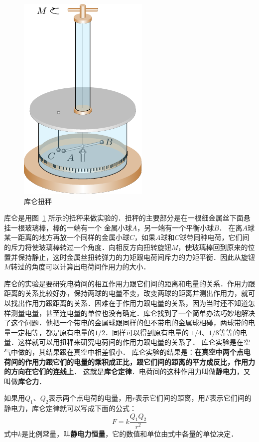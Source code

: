 \begin{figure}[htbp]
    \centering
    \includegraphics{fig/B/6-3.pdf}
    \caption{库仑扭秤}\label{fig_B_6-3}
\end{figure}

库仑是用图~\ref{fig_B_6-3} 所示的扭秤来做实验的．扭秤的主要部分是在一根细金属丝下面悬挂一根玻璃棒，棒的一端有一个
金属小球$A$，另一端有一个平衡小球$B$．
在离$A$球某一距离的地方再放一个同样的金属小球$C$，如果$A$球和$C$球带同种电荷，它们间的斥力将使玻璃棒转过一个角度．向相反方向扭转旋钮$M$，使玻璃棒回到原来的位置并保持静止，这时金属丝扭转弹力的力矩跟电荷间斥力的力矩平衡．因此从旋钮$M$转过的角度可以计算出电荷间作用力的大小．

库仑的实验是要研究电荷间的相互作用力跟它们间的距离和电量的关系．作用力跟距离的关系比较好办，保持两球的电量不变，改变两球的距离并测出作用力，就可以找出作用力跟距离的关系．困难在于作用力跟电量的关系，因为当时还不知道怎样测量电量，甚至连电量的单位也没有确定．库仑找到了一个简单办法巧妙地解决了这个问题．他把一个带电的金属球跟同样的但不带电的金属球相碰，两球带的电量一定相等，都是原有电量的$1/2$．同样可以得到原有电量的
$1/4$、$1/8$等等的电量．这样就可以用扭秤来研究电荷间的作用力跟电量的关系了．
库仑实验是在空气中做的，其结果跟在真空中相差很小．
库仑实验的结果是：\textbf{在真空中两个点电荷间的作用力跟它们的电量的乘积成正比，跟它们间的距离的平方成反比，作用力的方向在它们的连线上}．
这就是\textbf{库仑定律}．电荷间的这种作用力叫做\textbf{静电力}，又叫做\textbf{库仑力}．

如果用$Q_1$、$Q_2$表示两个点电荷的电量，用$r$表示它们间的距离，用$F$表示它们间的静电力，库仑定律就可以写成下面的公式：
\begin{equation}\label{eq_B-6-1}
F=k\frac{Q_1Q_2}{r^2}
\end{equation}
式中$k$是比例常量，叫\textbf{静电力恒量}，它的数值和单位由式中各量的单位决定．

